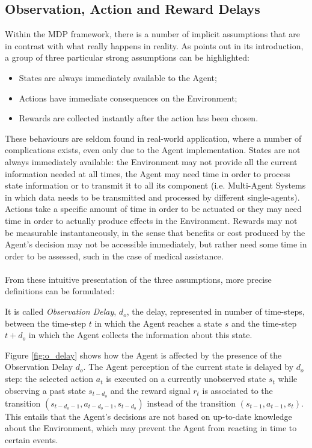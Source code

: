         \subsection{Observation, Action and Reward Delays}
            Within the MDP framework, there is a number of implicit assumptions that are in contrast with what really happens in reality. As  points out in its introduction, a group of three particular strong assumptions can be highlighted:
            \begin{itemize}[topsep=0.5em, partopsep=0.5em]
                \setlength\itemsep{0em}
                \item States are always immediately available to the Agent;
                \item Actions have immediate consequences on the Environment;
                \item Rewards are collected instantly after the action has been chosen.
            \end{itemize}
            These behaviours are seldom found in real-world application, where a number of complications exists, even only due to the Agent implementation. States are not always immediately available: the Environment may not provide all the current information needed at all times, the Agent may need time in order to process state information or to transmit it to all its component (i.e. Multi-Agent Systems in which data needs to be transmitted and processed by different single-agents). Actions take a specific amount of time in order to be actuated or they may need time in order to actually produce effects in the Environment. Rewards may not be measurable instantaneously, in the sense that benefits or cost produced by the Agent's decision may not be accessible immediately, but rather need some time in order to be assessed, such in the case of medical assistance.
            \\\\
            From these intuitive presentation of the three assumptions, more precise definitions can be formulated:
            
            \begin{definition}
                \label{def:obsdelay}
                It is called \textit{Observation Delay}, $d_o$, the delay, represented in number of time-steps, between the time-step $t$ in which the Agent reaches a state $s$ and the time-step $t+d_o$ in which the Agent collects the information about this state.
            \end{definition}
            \noindent
            Figure \ref{fig:o_delay} shows how the Agent is affected by the presence of the Observation Delay $d_o$. The Agent perception of the current state is delayed by $d_o$ step: the selected action $a_t$ is executed on a currently unobserved state $s_{t}$ while observing a past state $s_{t-d_{o}}$ and the reward signal $r_t$ is associated to the transition $(s_{t-d_{o}-1}, a_{t-d_{o}-1}, s_{t-d_{o}})$ instead of the transition $(s_{t-1}, a_{t-1}, s_{t})$. This entails that the Agent's decisions are not based on up-to-date knowledge about the Environment, which may prevent the Agent from reacting in time to certain events.
            
